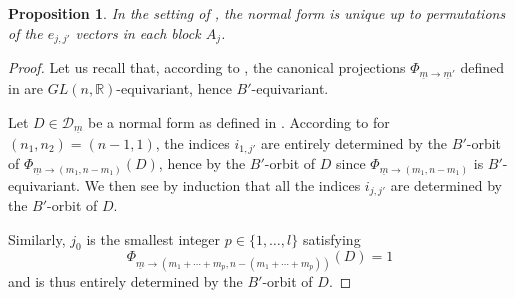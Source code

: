 \documentclass[pdftex]{sigma}
\numberwithin{equation}{section}
\newtheorem{Proposition}[Theorem]{Proposition}
\theoremstyle{definition}
\newcommand{\R}{\mathbb{R}}
\newcommand{\D}{\mathcal{D}}
\theoremstyle{plain}
\theoremstyle{plain}
\theoremstyle{plain}
\theoremstyle{plain}
\begin{document}
\begin{Proposition}
	In the setting of , the normal form is unique up to permutations of the $e_{j,j'}$ vectors in each block $A_j$.
\end{Proposition}
\begin{proof}
	Let us recall that, according to , the canonical projections $\Phi_{\underline m \to \underline m'}$ defined in  are $GL(n,\R)$-equivariant, hence $B'$-equivariant.

	Let $D \in \D_{\underline m}$ be a normal form as defined in . According to  for $(n_1,n_2) = (n-1,1)$, the indices $i_{1,j'}$ are entirely determined by the $B'$-orbit of $\Phi_{\underline m \to (m_1,n-m_1)}(D)$, hence by the $B'$-orbit of $D$ since $\Phi_{\underline m \to (m_1,n-m_1)}$ is $B'$-equivariant. We then see by induction that all the indices $i_{j,j'}$ are determined by the $B'$-orbit of $D$. 
	
	Similarly, $j_0$ is the smallest integer $p \in \{1,\dots,l\}$ satisfying 
	\begin{equation*}
		\Phi_{\underline m \to (m_1+\cdots+m_p,n-(m_1+\cdots+m_p))}(D)  = 1
	\end{equation*}
	and is thus entirely determined by the $B'$-orbit of $D$.
	

\end{proof}
\end{document}
